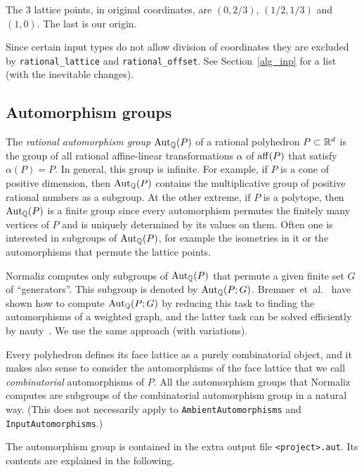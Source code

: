 The $3$ lattice points, in original coordinates, are $(0,2/3)$, $(1/2,1/3) $ and $(1,0)$. The last is our origin.

Since certain input types do not allow division of coordinates they are excluded by \verb|rational_lattice| and \verb|rational_offset|. See Section~\ref{alg_inp} for a list (with the inevitable changes).

\subsection{Automorphism groups}\label{Automorphisms}

\def\Aut{\operatorname{Aut}}

The \emph{rational automorphism group} $\Aut_\QQ(P)$ of a rational polyhedron $P\subset {\mathbb R}^d$ is the group of all rational affine-linear transformations $\alpha$ of $\operatorname{aff}(P)$ that satisfy $\alpha(P)=P$. In general, this group is infinite. For example, if $P$ is a cone of positive dimension, then $\Aut_\QQ(P)$ contains the multiplicative group of positive rational numbers as a subgroup. At the other extreme, if $P$ is a polytope, then $\Aut_\QQ(P)$ is a finite group since every automorphism permutes the finitely many vertices of $P$ and is uniquely determined by its values on them. Often one is interested in subgroups of $\Aut_\QQ(P)$, for example the isometries in it or the automorphisms that permute the lattice points.

Normaliz computes only subgroups of $\Aut_\QQ(P)$ that permute a given finite set $G$ of ``generators''. This subgroup is denoted by $\Aut_\QQ(P;G)$. Bremner~et~al.~\cite{Bremner} have shown how to compute $\Aut_\QQ(P;G)$ by reducing this task to finding the automorphisms of a weighted graph, and the latter task can be solved efficiently by nauty~\cite{nauty}. We use the same approach (with variations).

Every polyhedron defines its face lattice as a purely combinatorial object, and it makes also sense to consider the automorphisms of the face lattice that we call \emph{combinatorial} automorphisms of $P$. All the automorphism groups that Normaliz computes are subgroups of the combinatorial automorphism group in a natural way. (This does not necessarily apply to \verb|AmbientAutomorphisms| and \verb|InputAutomorphisms|.)

The automorphism group is contained in the extra output file \verb|<project>.aut|. Its contents are explained in the following.

